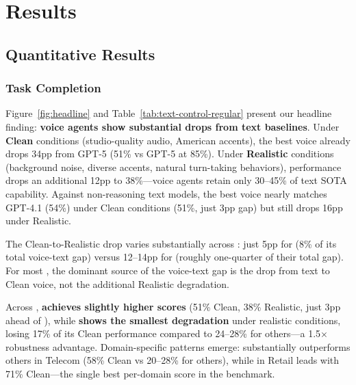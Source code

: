 \section{Results}
\label{sec:results}

\subsection{Quantitative Results}

\subsubsection{Task Completion}

Figure~\ref{fig:headline} and Table~\ref{tab:text-control-regular} present our headline finding: \textbf{voice agents show substantial drops from text baselines}. Under \textbf{Clean} conditions (studio-quality audio, American accents), the best voice  already drops 34pp from GPT-5 (51\% vs GPT-5 at 85\%). Under \textbf{Realistic} conditions (background noise, diverse accents, natural turn-taking behaviors), performance drops an additional 12pp to 38\%---voice agents retain only 30--45\% of text SOTA capability. Against non-reasoning text models, the best voice  nearly matches GPT-4.1 (54\%) under Clean conditions (51\%, just 3pp gap) but still drops 16pp under Realistic.

\begin{table}[h]
\caption{Text vs Voice comparison (pass@1). Text shows GPT-5 (reasoning) and GPT-4.1 (non-reasoning). Voice evaluated under Clean and Realistic conditions. Deltas show gap from GPT-5.}
\label{tab:text-control-regular}
\centering
\begin{small}
\resizebox{\columnwidth}{!}{%

}
\end{small}
\end{table}

The Clean-to-Realistic drop varies substantially across : just 5pp for  (8\% of its total voice-text gap) versus 12--14pp for  (roughly one-quarter of their total gap). For most , the dominant source of the voice-text gap is the drop from text to Clean voice, not the additional Realistic degradation.


Across , \textbf{ achieves slightly higher scores} (51\% Clean, 38\% Realistic, just 3pp ahead of ), while \textbf{ shows the smallest degradation} under realistic conditions, losing 17\% of its Clean performance compared to 24--28\% for others---a 1.5$\times$ robustness advantage. Domain-specific patterns emerge:  substantially outperforms others in Telecom (58\% Clean vs 20--28\% for others), while in Retail  leads with 71\% Clean---the single best per-domain score in the benchmark.

